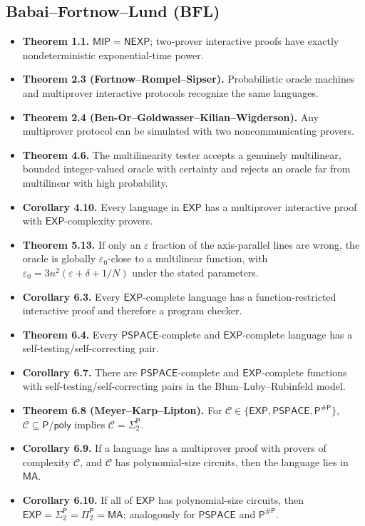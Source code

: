 \documentclass[10pt]{article}
\newcommand{\MIP}{\mathsf{MIP}}
\newcommand{\PSPACE}{\mathsf{PSPACE}}
\newcommand{\NEXP}{\mathsf{NEXP}}
\begin{document}
\subsection*{Babai--Fortnow--Lund (BFL)}
\begin{itemize}
\item \textbf{Theorem 1.1.} $\MIP=\NEXP$; two-prover interactive proofs have
exactly nondeterministic exponential-time power.
\item \textbf{Theorem 2.3 (Fortnow--Rompel--Sipser).} Probabilistic oracle
machines and multiprover interactive protocols recognize the same languages.
\item \textbf{Theorem 2.4 (Ben-Or--Goldwasser--Kilian--Wigderson).} Any
multiprover protocol can be simulated with two noncommunicating provers.
\item \textbf{Theorem 4.6.} The multilinearity tester accepts a genuinely
multilinear, bounded integer-valued oracle with certainty and rejects an oracle
far from multilinear with high probability.
\item \textbf{Corollary 4.10.} Every language in $\mathsf{EXP}$ has a
multiprover interactive proof with $\mathsf{EXP}$-complexity provers.
\item \textbf{Theorem 5.13.} If only an $\varepsilon$ fraction of the axis-parallel
lines are wrong, the oracle is globally
$\varepsilon_0$-close to a multilinear function, with
$\varepsilon_0=3n^2(\varepsilon+\delta+1/N)$ under the stated parameters.
\item \textbf{Corollary 6.3.} Every $\mathsf{EXP}$-complete language has a
function-restricted interactive proof and therefore a program checker.
\item \textbf{Theorem 6.4.} Every $\PSPACE$-complete and
$\mathsf{EXP}$-complete language has a self-testing/self-correcting pair.
\item \textbf{Corollary 6.7.} There are $\PSPACE$-complete and
$\mathsf{EXP}$-complete functions with self-testing/self-correcting pairs in
the Blum--Luby--Rubinfeld model.
\item \textbf{Theorem 6.8 (Meyer--Karp--Lipton).} For
$\mathcal C\in\{\mathsf{EXP},\PSPACE,\mathsf P^{\#\mathsf P}\}$,
$\mathcal C\subseteq\mathsf P/\mathsf{poly}$ implies
$\mathcal C=\Sigma_2^{\mathsf P}$.
\item \textbf{Corollary 6.9.} If a language has a multiprover proof with
provers of complexity $\mathcal C$, and $\mathcal C$ has polynomial-size
circuits, then the language lies in $\mathsf{MA}$.
\item \textbf{Corollary 6.10.} If all of $\mathsf{EXP}$ has polynomial-size
circuits, then
$\mathsf{EXP}=\Sigma_2^{\mathsf P}=\Pi_2^{\mathsf P}=\mathsf{MA}$; analogously
for $\PSPACE$ and $\mathsf P^{\#\mathsf P}$.
\end{itemize}
\end{document}
